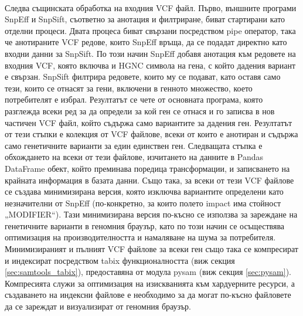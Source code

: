 \documentclass[pdftex,cyrillic,14pt,a4page,twoside,openright]{extreport}
\begin{document}
\paragraph{}
Следва същинската обработка на входния VCF файл. Първо, външните програми SnpEff и SnpSift, съответно за анотация и филтриране, биват стартирани като отделни процеси. Двата процеса биват свързани посредством pipe оператор, така че анотираните VCF редове, които SnpEff връща, да се подадат директно като входни данни за SnpSift. По този начин SnpEff добавя анотация към редовете на входния VCF, която включва и HGNC символа на гена, с който дадения вариант е свързан. SnpSift филтрира редовете, които му се подават, като оставя само тези, които се отнасят за гени, включени в генното множество, което потребителят е избрал. Резултатът се чете от основната програма, която разглежда всеки ред за да определи за кой ген се отнася и го записва в нов частичен VCF файл, който съдържа само вариантите за дадения ген. Резултатът от тези стъпки е колекция от VCF файлове, всеки от които е анотиран и съдържа само генетичните варианти за един единствен ген. Следващата стъпка е обхождането на всеки от тези файлове, изчитането на данните в Pandas DataFrame обект, който преминава поредица трансформации, и записването на крайната информация в базата данни. Също така, за всеки от тези VCF файлове се създава минимизирана версия, която изключва вариантите определени като незначителни от SnpEff (по-конкретно, за които полето impact има стойност „MODIFIER“). Тази минимизирана версия по-късно се използва за зареждане на генетичните варианти в геномния браузър, като по този начин се осъществява оптимизация на производителността и намаляване на шума за потребителя. Минимизираният и пълният VCF файлове за всеки ген също така се компресират и индексират посредством tabix функционалността (виж секция \ref{sec:samtools_tabix}), предоставяна от модула pysam (виж секция \ref{sec:pysam}). Компресията служи за оптимизация на изискванията към хардуерните ресурси, а създаването на индексни файлове е необходимо за да могат по-късно файловете да се зареждат и визуализират от геномния браузър.
\end{document}
